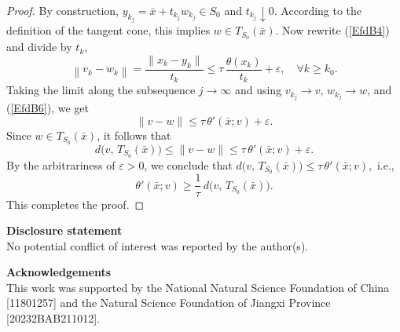 \documentclass[11pt]{article}
\begin{document}
\begin{proof}
	By construction, \(y_{k_j} = \bar{x} + t_{k_j} w_{k_j} \in S_0\) and \(t_{k_j}\downarrow 0\). According to the definition of the tangent cone, this implies	$		w \in T_{S_0}(\bar{x}).  $
	Now rewrite (\ref{EfdB4}) and divide by \(t_k\),
	\[
	\left\|v_k - w_k\right\| = \frac{\|x_k-y_k\|}{t_k}
	\le \tau\,\frac{\theta(x_k)}{t_k} + \varepsilon,  \quad  \forall    k\ge k_0.
	\]
	Taking the limit along the subsequence \(j\to\infty\) and using \(v_{k_j}\to v\), \(w_{k_j}\to w\), and  (\ref{EfdB6}), we get
	\[
	\|v - w\| \le \tau\,\theta'(\bar{x};v) + \varepsilon .
	\]
	Since \(w\in T_{S_0}(\bar{x})\), it follows that
	\[
	d \bigl(v,\,T_{S_0}(\bar{x})\bigr) \le \|v-w\| \le \tau\,\theta'(\bar{x};v) + \varepsilon .
	\]
	By the arbitrariness of   \(\varepsilon>0\),  we conclude that
	$	d  \bigl(v,\,T_{S_0}(\bar{x})\bigr) \le \tau\,\theta'(\bar{x};v),	$
	i.e.,
	\[
	\theta'(\bar{x};v) \ge \frac{1}{\tau}\,d \bigl(v,\,T_{S_0}(\bar{x})\bigr).
	\]
	This completes the proof.  \end{proof}

 
 \bigskip
 \noindent
 {\bf Disclosure statement}  \\
No potential conflict of interest was reported by the author(s).
 
\bigskip
\noindent
{\bf Acknowledgements}  \\
This work was supported by the National Natural Science Foundation of China [11801257] and the Natural Science Foundation of Jiangxi Province [20232BAB211012].
\end{document}
